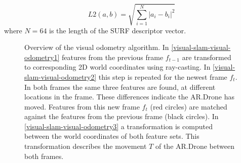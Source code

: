 \begin{equation}
L2(a,b) =\sqrt { \sum_{i=1}^{N} \left| a_i - b_i \right| ^2 }
\end{equation}
where $N = 64$ is the length of the SURF descriptor vector.

\begin{figure}[htb!]
  \begin{center}
\advance\leftskip-2.5cm\rightskip-2.5cm
 \end{center}
  \caption{Overview of the visual odometry algorithm. In \ref{visual-slam-visual-odometry1} features from the previous frame $f_{t-1}$ are transformed to corresponding 2D world coordinates using ray-casting. In \ref{visual-slam-visual-odometry2} this step is repeated for the newest frame $f_t$. In both frames the same three features are found, at different locations in the frame. These differences indicate the AR.Drone has moved. Features from this new frame $f_t$ (red circles) are matched against the features from the previous frame (black circles). In \ref{visual-slam-visual-odometry3} a transformation is computed between the world coordinates of both feature sets. This transformation describes the movement $T$ of the AR.Drone between both frames.}
  \label{visual-slam-visual-odometry}
\end{figure}


